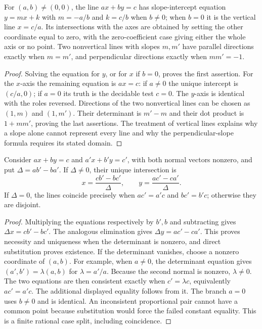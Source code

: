 \begin{theorem}
\label{geo:slope}
For $(a,b)\ne(0,0)$, the line $ax+by=c$ has slope-intercept equation
$y=mx+k$ with $m=-a/b$ and $k=c/b$ when $b\ne0$; when $b=0$ it is the
vertical line $x=c/a$. Its intersections with the axes are obtained by
setting the other coordinate equal to zero, with the zero-coefficient case
giving either the whole axis or no point. Two nonvertical lines with slopes
$m,m'$ have parallel directions exactly when $m=m'$, and perpendicular
directions exactly when $mm'=-1$.
\end{theorem}
\begin{proof}
Solving the equation for $y$, or for $x$ if $b=0$, proves the first assertion.
For the $x$-axis the remaining equation is $ax=c$: if $a\ne0$ the unique
intercept is $(c/a,0)$; if $a=0$ its truth is the decidable test $c=0$.
The $y$-axis is identical with the roles reversed. Directions of the two
nonvertical lines can be chosen as $(1,m)$ and $(1,m')$. Their determinant
is $m'-m$ and their dot product is $1+mm'$, proving the last assertions.
The treatment of vertical lines explains why a slope alone cannot represent
every line and why the perpendicular-slope formula requires its stated domain.
\end{proof}

\begin{theorem}
\label{geo:two-lines}
Consider $ax+by=c$ and $a'x+b'y=c'$, with both normal vectors nonzero, and
put $\Delta=ab'-ba'$. If $\Delta\ne0$, their unique intersection is
\[
 x=\frac{cb'-bc'}{\Delta},\qquad
 y=\frac{ac'-ca'}{\Delta}.
\]
If $\Delta=0$, the lines coincide precisely when
$ac'=a'c$ and $bc'=b'c$; otherwise they are disjoint.
\end{theorem}
\begin{proof}
Multiplying the equations respectively by $b',b$ and subtracting gives
$\Delta x=cb'-bc'$. The analogous elimination gives
$\Delta y=ac'-ca'$. This proves necessity and uniqueness when the determinant
is nonzero, and direct substitution proves existence.
If the determinant vanishes, choose a nonzero coordinate of $(a,b)$.
For example, when $a\ne0$, the determinant equation gives
$(a',b')=\lambda(a,b)$ for $\lambda=a'/a$.
Because the second normal is nonzero, $\lambda\ne0$.
The two equations are then consistent exactly when $c'=\lambda c$,
equivalently $ac'=a'c$. The additional displayed equality follows from it.
The branch $a=0$ uses $b\ne0$ and is identical. An inconsistent proportional
pair cannot have a common point because substitution would force the failed
constant equality. This is a finite rational case split, including coincidence.
\end{proof}

